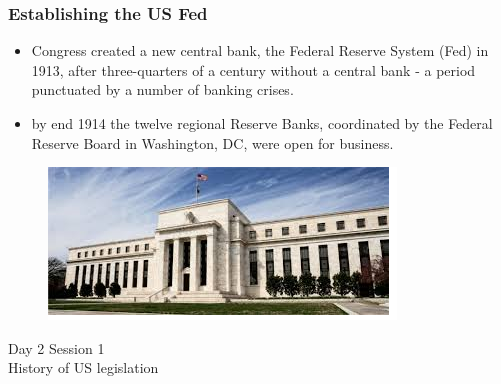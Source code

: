 \documentclass[11pt]{beamer}
\begin{document}
\begin{frame}
\frametitle{Establishing the US Fed}

\begin{itemize}
\item  Congress created a new central bank, the Federal Reserve System (Fed) in 1913, after three-quarters of a century without a central bank - a period punctuated by a number of banking crises.
\item by end 1914 the twelve regional Reserve Banks, coordinated by the Federal Reserve Board in Washington, DC, were open for business.
\end{itemize}
\begin{figure}
\includegraphics[]{Fed.png}
\end{figure}
\end{frame}














\begin{frame}
\begin{center}
 Day 2 Session 1 \\
 History of US legislation
\end{center}
\end{frame}
\end{document}
